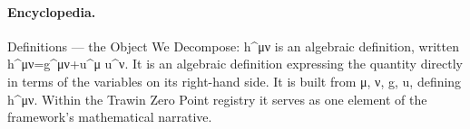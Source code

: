 \paragraph{Encyclopedia.}
Definitions — the Object We Decompose: h\textasciicircum{}μν is an algebraic definition, written h\textasciicircum{}μν=g\textasciicircum{}μν+u\textasciicircum{}μ u\textasciicircum{}ν. It is an algebraic definition expressing the quantity directly in terms of the variables on its right-hand side. It is built from μ, ν, g, u, defining h\textasciicircum{}μν. Within the Trawin Zero Point registry it serves as one element of the framework's mathematical narrative.
